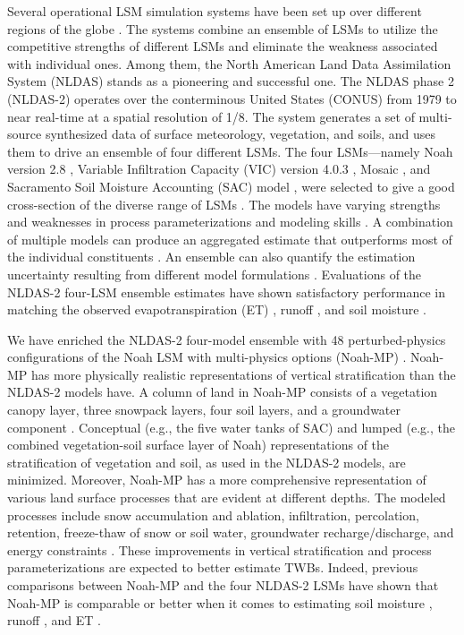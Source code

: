 \documentclass[essd, manuscript]{copernicus}
\begin{document}
Several operational LSM simulation systems have been set up over different regions of the globe \citep{xia2019JMR, shi2011SCES, carrera2015JH, rodell2004BAMS}. The systems combine an ensemble of LSMs to utilize the competitive strengths of different LSMs and eliminate the weakness associated with individual ones. Among them, the North American Land Data Assimilation System (NLDAS) \citep{xia2012JGRAa, xia2012JGRA, mitchell2004JGRA} stands as a pioneering and successful one. The NLDAS phase 2 (NLDAS-2) operates over the conterminous United States (CONUS) from 1979 to near real-time at a spatial resolution of 1/8\degree{}. The system generates a set of multi-source synthesized data of surface meteorology, vegetation, and soils, and uses them to drive an ensemble of four different LSMs. The four LSMs---namely Noah version 2.8 \citep{ek2003JGRA, chen2001MWR, chen2001MWRa, chen1997BM}, Variable Infiltration Capacity (VIC) version 4.0.3 \citep{liang1994JGRA}, Mosaic \citep{koster1992JGRA}, and Sacramento Soil Moisture Accounting (SAC) model \citep{burnash1973}, were selected to give a good cross-section of the diverse range of LSMs \citep{mitchell2004JGRA}. The models have varying strengths and weaknesses in process parameterizations and modeling skills \citep{kumar2017WRR}. A combination of multiple models can produce an aggregated estimate that outperforms most of the individual constituents \citep{fei2021WRR, beck2017HESS, guo2007QJRMS, ajami2007WRR}. An ensemble can also quantify the estimation uncertainty resulting from different model formulations \citep{troin2021WRR, cloke2009JH}. Evaluations of the NLDAS-2 four-LSM ensemble estimates have shown satisfactory performance in matching the observed evapotranspiration (ET) \citep{zhang2020AFM, xia2012JGRA, kumar2018RS}, runoff \citep{xia2012JGRAa}, and soil moisture \citep{xia2015JHa, xia2015JH}.

We have enriched the NLDAS-2 four-model ensemble with 48 perturbed-physics configurations of the Noah LSM with multi-physics options (Noah-MP) \citep{fei2021WRR, zheng2020JAMES, zheng2019WRR}. Noah-MP has more physically realistic representations of vertical stratification than the NLDAS-2 models have. A column of land in Noah-MP consists of a vegetation canopy layer, three snowpack layers, four soil layers, and a groundwater component \citep{niu2011JGRA, yang2011JGRA}. Conceptual (e.g., the five water tanks of SAC) and lumped (e.g., the combined vegetation-soil surface layer of Noah) representations of the stratification of vegetation and soil, as used in the NLDAS-2 models, are minimized. Moreover, Noah-MP has a more comprehensive representation of various land surface processes that are evident at different depths. The modeled processes include snow accumulation and ablation, infiltration, percolation, retention, freeze-thaw of snow or soil water, groundwater recharge/discharge, and energy constraints \citep{niu2011JGRA}. These improvements in vertical stratification and process parameterizations are expected to better estimate TWBs. Indeed, previous comparisons between Noah-MP and the four NLDAS-2 LSMs have shown that Noah-MP is comparable or better when it comes to estimating soil moisture \citep{cai2014JGRAa}, runoff \citep{cai2014JGRA, fei2021WRR}, and ET \citep{zhang2020AFM}.
\end{document}
